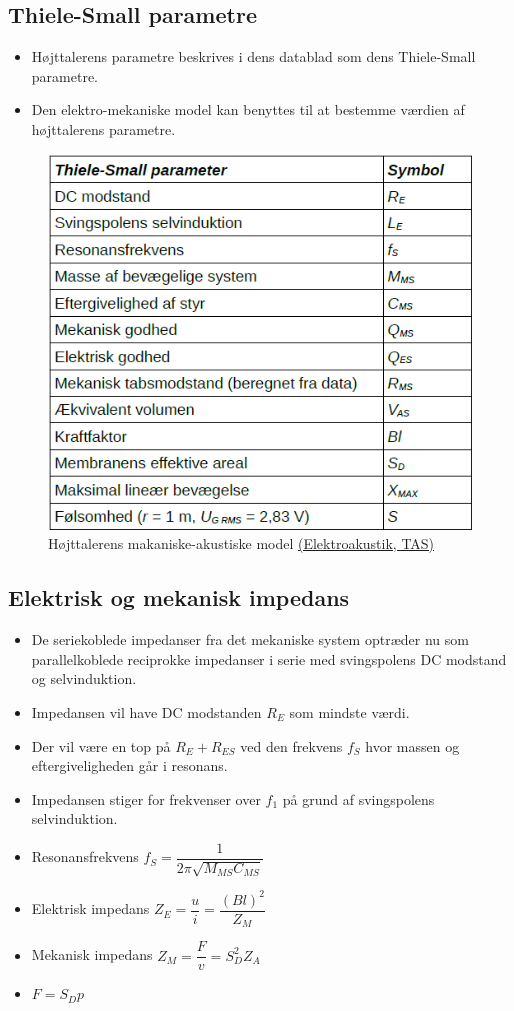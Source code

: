 \subsection{Thiele-Small parametre}
\begin{itemize}
	\item Højttalerens parametre beskrives i dens datablad som dens Thiele-Small parametre.
	\item Den elektro-mekaniske model kan benyttes til at bestemme værdien af højttalerens parametre.
\end{itemize}
\begin{figure} [H]
	\centering
	\includegraphics[width=0.85\linewidth]{graphics/27.png}
	\caption{Højttalerens makaniske-akustiske model \href{http://www.torean.dk/artikel/Elektroakustik.pdf}{(Elektroakustik, TAS)}}
	\label{fig:27}
\end{figure}

\subsection{Elektrisk og mekanisk impedans}
\begin{itemize}
	\item De seriekoblede impedanser fra det mekaniske system optræder nu som parallelkoblede reciprokke	impedanser i serie med svingspolens DC modstand og selvinduktion. 
	\item Impedansen vil have DC modstanden $R_E$ som mindste værdi. 
	\item Der vil være en top på $R_E + R_{ES}$ ved den frekvens $f_S$ hvor
	massen og eftergiveligheden går i resonans.
	\item Impedansen stiger for frekvenser over $f_1$ på grund af svingspolens selvinduktion. 
	\item Resonansfrekvens $f_S = \dfrac{1}{2\pi\sqrt{M_{MS}C_{MS}}}$
	\item Elektrisk impedans $Z_E = \dfrac{u}{i} = \dfrac{(Bl)^2}{Z_M}$
	\item Mekanisk impedans $Z_M = \dfrac{F}{v}= S_D^2Z_A$
	\item $F= S_D p$
\end{itemize}

